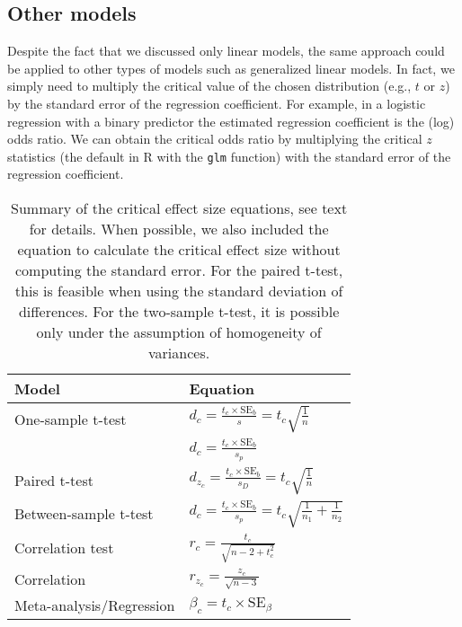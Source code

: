 \documentclass[
  man,floatsintext]{apa7}
\begin{document}
\subsection{Other models}\label{other-models}

Despite the fact that we discussed only linear models, the same approach could be applied to other types of models such as generalized linear models. In fact, we simply need to multiply the critical value of the chosen distribution (e.g., \(t\) or \(z\)) by the standard error of the regression coefficient. For example, in a logistic regression with a binary predictor the estimated regression coefficient is the (log) odds ratio. We can obtain the critical odds ratio by multiplying the critical \(z\) statistics (the default in R with the \texttt{glm} function) with the standard error of the regression coefficient.

\footnotesize

\begin{table}[H]

\caption{\label{tab:eqsummary}Summary of the critical effect size equations, see text for details. When possible, we also included the equation to calculate the critical effect size without computing the standard error. For the paired t-test, this is feasible when using the standard deviation of differences. For the two-sample t-test, it is possible only under the assumption of homogeneity of variances.}
\centering
\begin{tabular}[t]{ll}
\toprule
\textbf{Model} & \textbf{Equation}\\
\midrule
One-sample t-test & $d_c = \frac{t_c \times \mbox{SE}_b}{s} = t_c\sqrt{\frac{1}{n}}$\\
\cmidrule{1-2}
 & $d_c = \frac{t_c \times \mbox{SE}_b}{s_p}$\\
\cmidrule{2-2}
\multirow{-2}{*}{\raggedright\arraybackslash Paired t-test} & $d_{z_c} = \frac{t_c \times \mbox{SE}_b}{s_D} = t_c\sqrt{\frac{1}{n}}$\\
\cmidrule{1-2}
Between-sample t-test & $d_c = \frac{t_c \times \mbox{SE}_b}{s_p} = t_c\sqrt{\frac{1}{n_1} + \frac{1}{n_2}}$\\
\cmidrule{1-2}
Correlation test & $r_c = \frac{t_c}{\sqrt{n - 2 + t^2_c}}$\\
\cmidrule{1-2}
Correlation & $r_{z_c} = \frac{z_c}{\sqrt{n - 3}}$\\
\cmidrule{1-2}
Meta-analysis/Regression & $\beta_c = t_c \times \mbox{SE}_{\beta}$\\
\bottomrule
\end{tabular}
\end{table}
\end{document}
